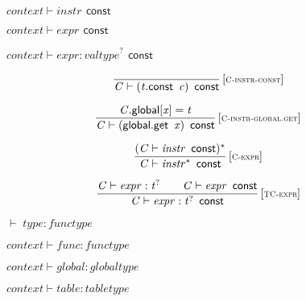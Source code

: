 \vspace{1ex}

$\boxed{{\mathit{context}} \vdash {\mathit{instr}}~\,\mathsf{const}}$

$\boxed{{\mathit{context}} \vdash {\mathit{expr}}~\,\mathsf{const}}$

$\boxed{{\mathit{context}} \vdash {\mathit{expr}} : {{\mathit{valtype}}^?}~\,\mathsf{const}}$

$$
\begin{array}{@{}c@{}}\displaystyle
\frac{
}{
{\mathit{C}} \vdash ({\mathit{t}}.\mathsf{const}~\,{\mathit{c}})~\,\mathsf{const}
} \, {[\textsc{\scriptsize C{-}instr{-}const}]}
\qquad
\end{array}
$$

$$
\begin{array}{@{}c@{}}\displaystyle
\frac{
{\mathit{C}}.\mathsf{global}{}[{\mathit{x}}] = {\mathit{t}}
}{
{\mathit{C}} \vdash (\mathsf{global.get}~\,{\mathit{x}})~\,\mathsf{const}
} \, {[\textsc{\scriptsize C{-}instr{-}global.get}]}
\qquad
\end{array}
$$

\vspace{1ex}

$$
\begin{array}{@{}c@{}}\displaystyle
\frac{
({\mathit{C}} \vdash {\mathit{instr}}~\,\mathsf{const})^\ast
}{
{\mathit{C}} \vdash {{\mathit{instr}}^\ast}~\,\mathsf{const}
} \, {[\textsc{\scriptsize C{-}expr}]}
\qquad
\end{array}
$$

\vspace{1ex}

$$
\begin{array}{@{}c@{}}\displaystyle
\frac{
{\mathit{C}} \vdash {\mathit{expr}} : {{\mathit{t}}^?}
 \qquad
{\mathit{C}} \vdash {\mathit{expr}}~\,\mathsf{const}
}{
{\mathit{C}} \vdash {\mathit{expr}} : {{\mathit{t}}^?}~\,\mathsf{const}
} \, {[\textsc{\scriptsize TC{-}expr}]}
\qquad
\end{array}
$$

\vspace{1ex}

$\boxed{{ \vdash }\;{\mathit{type}} : {\mathit{functype}}}$

$\boxed{{\mathit{context}} \vdash {\mathit{func}} : {\mathit{functype}}}$

$\boxed{{\mathit{context}} \vdash {\mathit{global}} : {\mathit{globaltype}}}$

$\boxed{{\mathit{context}} \vdash {\mathit{table}} : {\mathit{tabletype}}}$

